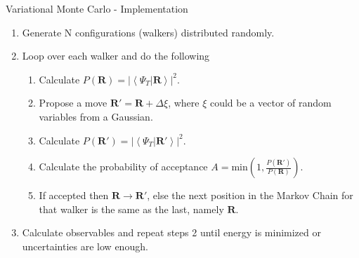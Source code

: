 \documentclass{beamer}
\newcommand{\braket}[2]{\left< #1 | #2 \right>}
\newcommand{\R}{\mathbf{R}}
\begin{document}
\begin{frame}{Variational Monte Carlo - Implementation}
\begin{enumerate}
   \item Generate N configurations (walkers) distributed randomly.
   \item Loop over each walker and do the following
   \begin{enumerate}
      \setlength\itemsep{0.2em}
      \item Calculate $P(\R) = \left|\braket{\Psi_T}{\R}\right|^2$.
      \item Propose a move $\R' = \R + \Delta\xi$, where $\xi$ could be a vector of random variables from a Gaussian.
      \item Calculate $P(\R') = \left|\braket{\Psi_T}{\R'}\right|^2$.
      \item Calculate the probability of acceptance $A=\mathrm{min}\left(1,\frac{P(\R')}{P(\R)}\right)$.
      \item If accepted then $\R \rightarrow \R'$, else the next position in the Markov Chain for that walker is the same as the last, namely $\R$.
   \end{enumerate}
   \item Calculate observables and repeat steps 2 until energy is minimized or uncertainties are low enough.
\end{enumerate}
\end{frame}
\end{document}
